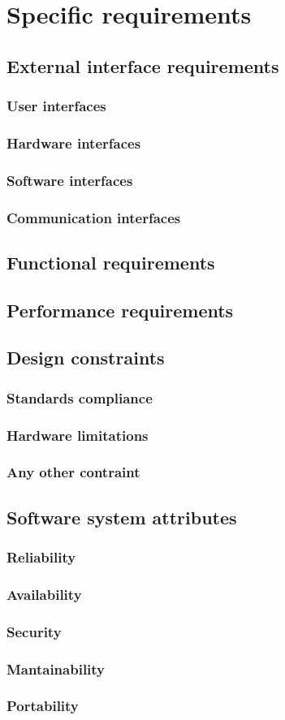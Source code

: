 \section{Specific requirements}
\subsection{External interface requirements}
\subsubsection{User interfaces}
\subsubsection{Hardware interfaces}
\subsubsection{Software interfaces}
\subsubsection{Communication interfaces}
\subsection{Functional requirements}
\subsection{Performance requirements}
\subsection{Design constraints}
\subsubsection{Standards compliance}
\subsubsection{Hardware limitations}
\subsubsection{Any other contraint}
\subsection{Software system attributes}
\subsubsection{Reliability}
\subsubsection{Availability}
\subsubsection{Security}
\subsubsection{Mantainability}
\subsubsection{Portability}